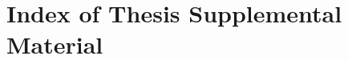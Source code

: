 \documentclass[hidelinks,a4paper,11pt,openany]{article}
\newcommand{\supplementName}{Index of Thesis Supplemental Material}
\begin{document}
\section*{\supplementName}




\end{document}
